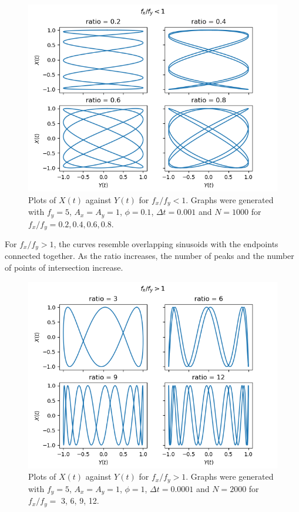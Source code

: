 \documentclass{article}
\begin{document}
		\begin{figure}[H]
			\centering
			\includegraphics[scale=0.7]{plots/ratio1.png}
			\caption
			{
				Plots of $X(t)$ against $Y(t)$ for $f_x/f_y < 1$. Graphs were generated with $f_y = 5$, $A_x = A_y = 1$, $\phi = 0.1$, $\Delta{t} = 0.001$ and $N = 1000$ for $f_x/f_y = 0.2, 0.4, 0.6, 0.8$.  
			}
		\end{figure}

		For $f_x/f_y > 1$, the curves resemble overlapping sinusoids with the endpoints connected together. As the ratio increases, the number of peaks and the number of points of intersection increase.

		\begin{figure}[H]
			\centering 
			\includegraphics[scale=0.7]{plots/ratio2.png}
			\caption
			{
				Plots of $X(t)$ against $Y(t)$ for $f_x/f_y > 1$. Graphs were generated with $f_y = 5$, $A_x = A_y = 1$, $\phi = 1$, $\Delta{t} = 0.0001$ and $N = 2000$ for $f_x/f_y =$ 3, 6, 9, 12.  
			}
		\end{figure}
\end{document}
